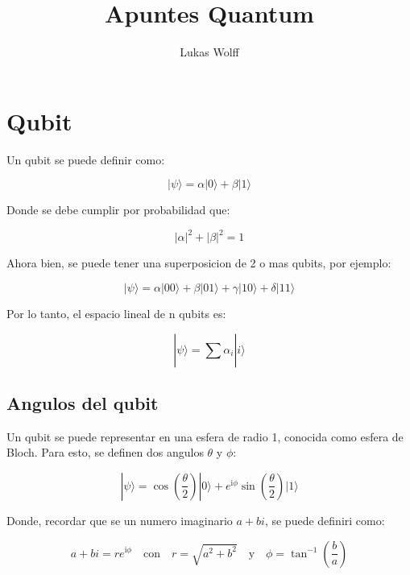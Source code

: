 \documentclass[11pt]{article}
\title{Apuntes Quantum}
\author{
    Lukas Wolff}
\date{}
\newcommand{\ii}{\mathrm{i}}
\begin{document}
\maketitle

\section{Qubit}

Un qubit se puede definir como:

\begin{equation}
    |\psi\rangle = \alpha |0\rangle + \beta |1\rangle
\end{equation}

Donde se debe cumplir por probabilidad que:

\begin{equation}
    |\alpha|^2 + |\beta|^2 = 1
\end{equation}

Ahora bien, se puede tener una superposicion de 2 o mas qubits, por ejemplo:

\begin{equation}
    |\psi\rangle = \alpha |00\rangle + \beta |01\rangle + \gamma |10\rangle + \delta |11\rangle
\end{equation}

Por lo tanto, el espacio lineal de n qubits es:

\begin{equation}
    |\psi\rangle = \sum_{}^{} \alpha_i |i\rangle
\end{equation}

\subsection{Angulos del qubit}

Un qubit se puede representar en una esfera de radio 1, conocida como esfera de Bloch. Para esto, se definen dos angulos $\theta$ y $\phi$:

\begin{equation}
    |\psi\rangle = \cos\left(\frac{\theta}{2}\right) |0\rangle + e^{\ii \phi} \sin\left(\frac{\theta}{2}\right) |1\rangle
\end{equation}

Donde, recordar que se un numero imaginario $a + bi$, se puede definiri como:

\begin{equation}
    a + bi = re^{\ii \phi} \quad \text{con} \quad r = \sqrt{a^2 + b^2} \quad \text{y} \quad \phi = \tan^{-1}\left(\frac{b}{a}\right)
\end{equation}
\end{document}
